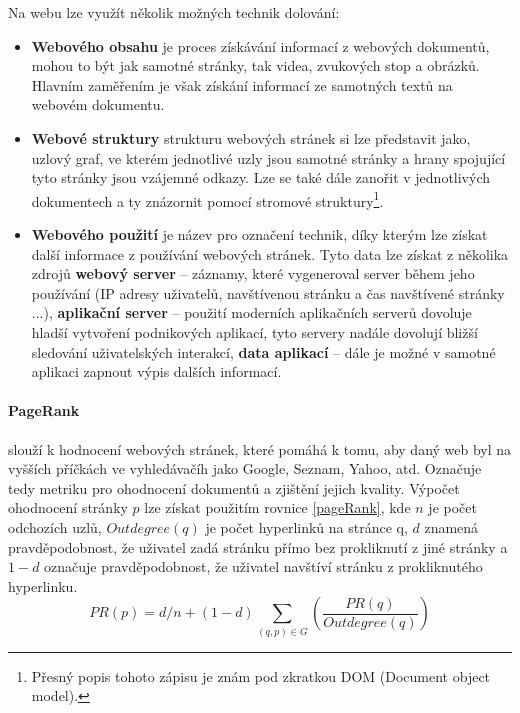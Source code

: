 \par Na webu lze využít několik možných technik dolování:
\begin{itemize}
\item \textbf{Webového obsahu} je proces získávání informací z webových dokumentů, mohou to být jak samotné stránky, tak videa, zvukových stop a obrázků. Hlavním zaměřením je však získání informací ze samotných textů na webovém dokumentu.
\item \textbf{Webové struktury} strukturu webových stránek si lze představit jako, uzlový graf, ve kterém jednotlivé uzly jsou samotné stránky a hrany spojující tyto stránky jsou vzájemné odkazy. Lze se také dále zanořit v jednotlivých dokumentech a ty znázornit pomocí stromové struktury\footnote{Přesný popis tohoto zápisu je znám pod zkratkou DOM (Document object model).}.
\item \textbf{Webového použití} je název pro označení technik, díky kterým lze získat další informace z používání webových stránek. Tyto data lze získat z několika zdrojů \textbf{webový server} -- záznamy, které vygeneroval server během jeho používání (IP adresy uživatelů, navštívenou stránku a čas navštívené stránky ...), \textbf{aplikační server} -- použití moderních aplikačních serverů dovoluje hladší vytvoření podnikových aplikací, tyto servery nadále dovolují bližší sledování uživatelských interakcí, \textbf{data aplikací} -- dále je možné v samotné aplikaci zapnout výpis dalších informací. \cite{minigbook}
\end{itemize}

\paragraph{PageRank} slouží k hodnocení webových stránek, které pomáhá k tomu, aby daný web byl na vyšších příčkách ve vyhledávačíh jako Google, Seznam, Yahoo, atd. Označuje tedy metriku pro ohodnocení dokumentů a zjištění jejich kvality. Výpočet ohodnocení stránky \(p\) lze získat použitím rovnice \ref{pageRank}, kde \(n\) je počet odchozích uzlů, \(Outdegree(q)\) je počet hyperlinků na stránce q, \(d\) znamená pravděpodobnost, že uživatel zadá stránku přímo bez prokliknutí z jiné stránky a \(1 - d\) označuje pravděpodobnost, že uživatel navštíví stránku z prokliknutého hyperlinku. \cite{minigbook}
\begin{equation} \label{pageRank}
PR(p) = d/n + (1-d) \sum_{(q,p) \in G}(\frac{PR(q)}{Outdegree(q)})
\end{equation}

